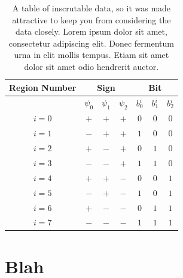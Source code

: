     \begin{table}[p]
        \caption[A table of inscrutable data, so it was made attractive to keep you from considering the data closely.]
                {A table of inscrutable data, so it was made attractive to keep you from considering the data closely.
                    Lorem ipsum dolor sit amet, consectetur adipiscing elit. Donec fermentum 
                    urna in elit mollis tempus. Etiam sit amet dolor sit amet odio hendrerit 
                    auctor. 
                    }
        \begin{center}
            \begin{tabular}{|c|c|c|c|c|c|c|} \hline
                Region Number & \multicolumn{3}{|c|}{Sign}           & \multicolumn{3}{|c|}{Bit} \\ \hline
                              & \(\psi_0\) & \(\psi_1\) & \(\psi_2\) & \(b^i_0\) & \(b^i_1\) & \(b^i_2\) \\ \hline
                \(i = 0\)     & \(+\)      & \(+\)      & \(+\)      & \(0\)     & \(0\)     & \(0\)   \\ \hline
                \(i = 1\)     & \(-\)      & \(+\)      & \(+\)      & \(1\)     & \(0\)     & \(0\)   \\ \hline
                \(i = 2\)     & \(+\)      & \(-\)      & \(+\)      & \(0\)     & \(1\)     & \(0\)   \\ \hline
                \(i = 3\)     & \(-\)      & \(-\)      & \(+\)      & \(1\)     & \(1\)     & \(0\)   \\ \hline
                \(i = 4\)     & \(+\)      & \(+\)      & \(-\)      & \(0\)     & \(0\)     & \(1\)   \\ \hline
                \(i = 5\)     & \(-\)      & \(+\)      & \(-\)      & \(1\)     & \(0\)     & \(1\)   \\ \hline
                \(i = 6\)     & \(+\)      & \(-\)      & \(-\)      & \(0\)     & \(1\)     & \(1\)   \\ \hline
                \(i = 7\)     & \(-\)      & \(-\)      & \(-\)      & \(1\)     & \(1\)     & \(1\)   \\ \hline
            \end{tabular}
        \end{center}
        \label{tab:multiregion-encoding}
    \end{table}

\section{Blah}

